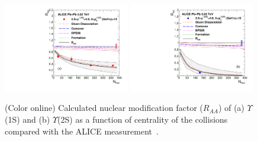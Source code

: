 \documentclass[12pt,a4paper,final]{iopart} %
\begin{document}
\begin{figure}
\includegraphics[width=0.49\textwidth]{Fig10a_Y1S_ALICE_RAANPart_Shade.pdf}
\includegraphics[width=0.49\textwidth]{Fig10b_Y2S_ALICE_RAANPart_Shade.pdf}
\caption{(Color online) Calculated nuclear modification factor ($R_{AA}$) of 
  (a) $\Upsilon$(1S) and (b) $\Upsilon$(2S) as a function of centrality of 
  the collisions compared with the ALICE measurement~\cite{ALICE:Y5TeV}.}
\label{fig:UpsilonRaaNPartALICE}
\end{figure}
\end{document}
